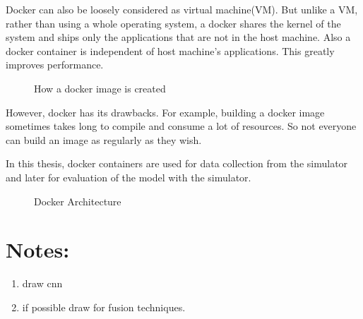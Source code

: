 Docker can also be loosely considered as virtual machine(VM). But unlike a VM, rather than
using a whole operating system, a docker shares the kernel of the system and ships only
the applications that are not in the host machine. Also a docker container is independent
of host machine's applications. This greatly improves performance.

\begin{figure}[h]
    \centering
    \def\svgwidth{0.8\textwidth}
    
    \caption{How a docker image is created}
    \label{fig:dockerimage}
\end{figure}

However, docker has its drawbacks. For example, building a docker image sometimes takes
long to compile and consume a lot of resources. So not everyone can build an image as
regularly as they wish.

In this thesis, docker containers are used for data collection from the simulator and later
for evaluation of the model with the simulator.

\begin{figure}[h]
    \centering
    \def\svgwidth{0.9\textwidth}
    
    \caption{Docker Architecture}
    \label{fig:dockerarchitecure}
\end{figure}
\vfill
\section{Notes:}

\begin{enumerate}
    \item draw cnn
    \item if possible draw for fusion techniques.
\end{enumerate}




